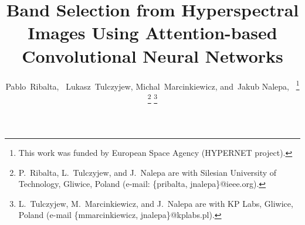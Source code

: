 \documentclass[journal]{IEEEtran}
\begin{document}
%

\title{Band Selection from Hyperspectral Images Using Attention-based Convolutional Neural Networks}
%
%
%
\author{Pablo~Ribalta,~
        Lukasz~Tulczyjew,
        Michal~Marcinkiewicz,
        and~Jakub Nalepa,~%
\thanks{This work was funded by European Space Agency (HYPERNET project).}
\thanks{P.~Ribalta, L.~Tulczyjew, and J.~Nalepa are with Silesian University of Technology, Gliwice, Poland (e-mail: \{pribalta, jnalepa\}@ieee.org).}%
\thanks{L.~Tulczyjew, M.~Marcinkiewicz, and J.~Nalepa are with KP Labs, Gliwice, Poland (e-mail \{mmarcinkiewicz, jnalepa\}@kplabs.pl).}%
}

%
%
\end{document}
